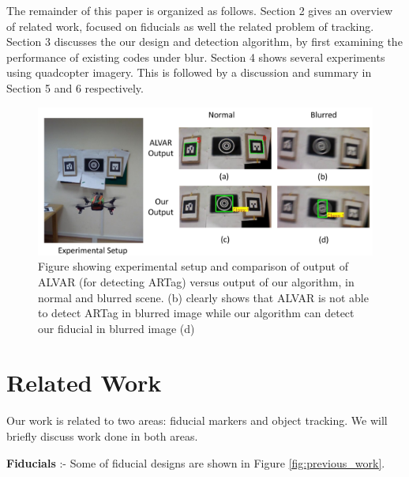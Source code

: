 \documentclass[runningheads]{llncs}
\begin{document}
The remainder of this paper is organized as follows.   Section 2 gives an
overview of related work, focused on fiducials as well the related problem of
tracking.  Section 3 discusses the our design and detection algorithm, by first
examining the performance of existing codes under blur. Section 4 shows several
experiments using quadcopter imagery.  This is followed by a discussion and
summary in Section 5 and 6 respectively.

\begin{figure}
\includegraphics[width=\linewidth]{teaser.pdf}
\caption{Figure showing experimental setup and comparison of
output of ALVAR\cite{alvar} (for detecting ARTag) versus output of our
algorithm, in normal and blurred scene. (b) clearly shows that ALVAR is not
able to detect ARTag in blurred image while our algorithm can detect our
fiducial in blurred image (d)}
\label{fig:teaser}
\end{figure}

\section{Related Work}

Our work is related to two areas: fiducial markers and
object tracking. We will briefly discuss work done in both areas.

\textbf{Fiducials} :- Some of fiducial designs are shown in Figure
\ref{fig:previous_work}.
\end{document}
